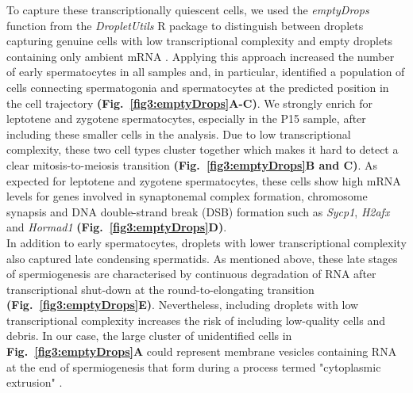 To capture these transcriptionally quiescent cells, we used the \emph{emptyDrops} function from the \emph{DropletUtils} R package to distinguish between droplets capturing genuine cells with low transcriptional complexity and empty droplets containing only ambient mRNA \citep{Lun2018}. 
Applying this approach increased the number of early spermatocytes in all samples and, in particular, identified a population of cells connecting spermatogonia and spermatocytes at the predicted position in the cell trajectory \textbf{(Fig.~\ref{fig3:emptyDrops}A-C)}. 
We strongly enrich for leptotene and zygotene spermatocytes, especially in the P15 sample, after including these smaller cells in the analysis. Due to low transcriptional complexity, these two cell types cluster together which makes it hard to detect a clear mitosis-to-meiosis transition \textbf{(Fig.~\ref{fig3:emptyDrops}B and C)}. 
As expected for leptotene and zygotene spermatocytes, these cells show high mRNA levels for genes involved in synaptonemal complex formation, chromosome synapsis and DNA double-strand break (DSB) formation such as \textit{Sycp1}, \textit{H2afx} and \textit{Hormad1} \citep{Daniel2011, Mahadevaiah2001, Vries2005} \textbf{(Fig.~\ref{fig3:emptyDrops}D)}.\\

In addition to early spermatocytes, droplets with lower transcriptional complexity also captured late condensing spermatids. 
As mentioned above, these late stages of spermiogenesis are characterised by continuous degradation of RNA after transcriptional shut-down at the round-to-elongating transition \citep{Steger1999} \textbf{(Fig.~\ref{fig3:emptyDrops}E)}. 
Nevertheless, including droplets with low transcriptional complexity increases the risk of including low-quality cells and debris. 
In our case, the large cluster of unidentified cells in \textbf{Fig.~\ref{fig3:emptyDrops}A} could represent membrane vesicles containing RNA at the end of spermiogenesis that form during a process termed "cytoplasmic extrusion" \citep{Rengan2012}.\\

\newpage

